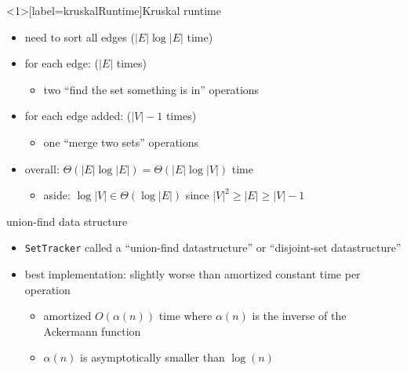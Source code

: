 \begin{frame}<1>[label=kruskalRuntime]{Kruskal runtime}
    \begin{itemize}
    \item need to sort all edges ($|E|\log|E|$ time)
    \item for each edge: ($|E|$ times) 
        \begin{itemize}
        \item two ``find the set something is in'' operations
        \end{itemize}
    \item for each edge added: ($|V|-1$ times) 
        \begin{itemize}
        \item one ``merge two sets'' operations
        \end{itemize}
    \vspace{.5cm}
    \item<2> overall: $\Theta(|E|\log|E|) = \Theta(|E|\log|V|)$ time
        \begin{itemize}
            \item aside: $\log|V| \in \Theta(\log|E|)$ since $|V|^2 \ge |E| \ge |V| - 1$
        \end{itemize}
    \end{itemize}
\end{frame}

\begin{frame}{union-find data structure}
    \begin{itemize}
    \item \texttt{SetTracker} called a ``union-find datastructure'' or ``disjoint-set datastructure''
    \item best implementation: slightly worse than amortized constant time per operation
        \begin{itemize}
            \item amortized $O(\alpha(n))$ time where $\alpha(n)$ is the inverse of the Ackermann function
            \item $\alpha(n)$ is asymptotically smaller than $\log(n)$
        \end{itemize}
    \end{itemize}
\end{frame}

